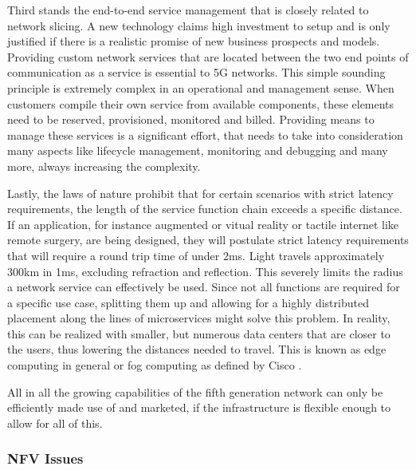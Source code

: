 Third stands the end-to-end service management that is closely related to network slicing. A new technology claims high investment to setup and is only justified if there is a realistic promise of new business prospects and models. Providing custom network services that are located between the two end points of communication as a service is essential to 5G networks. This simple sounding principle is extremely complex in an operational and management sense. When customers compile their own service from available components, these elements need to be reserved, provisioned, monitored and billed. Providing means to manage these services is a significant effort, that needs to take into consideration many aspects like lifecycle management, monitoring and debugging and many more, always increasing the complexity. 

Lastly, the laws of nature prohibit that for certain scenarios with strict latency requirements, the length of the service function chain exceeds a specific distance. If an application, for instance augmented or vitual reality or tactile internet like remote surgery, are being designed, they will postulate strict latency requirements that will require a round trip time of under 2ms. Light travels approximately 300km in 1ms, excluding refraction and reflection.  This severely limits the radius a network service can effectively be used. Since not all functions are required for a specific use case, splitting them up and allowing for a highly distributed placement along the lines of microservices might solve this problem. In reality, this can be realized with smaller, but numerous data centers that are closer to the users, thus lowering the distances needed to travel. This is known as edge computing in general or fog computing as defined by Cisco \cite{ordonez2017network} \cite{nfv5g} \cite{alexgalis2018multi} \cite{alexgalis2017analysis} \cite{cn5gvnf} \cite{de2019network}. 


All in all the growing capabilities of the fifth generation network can only be efficiently made use of and marketed, if the infrastructure is flexible enough to allow for all of this. 


\subsubsection{NFV Issues}





